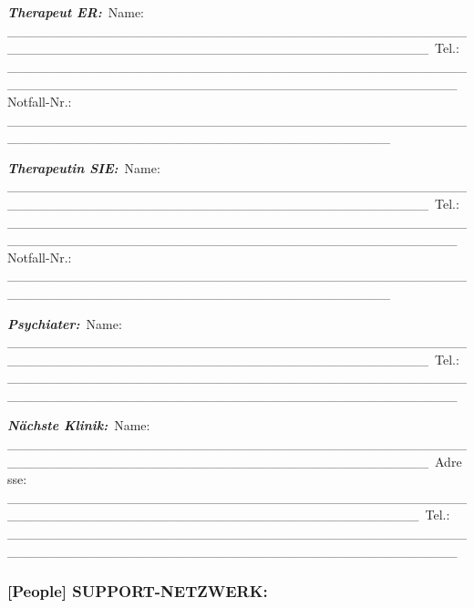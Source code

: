 \emph{\textbf{Therapeut ER:}}\
Name: \_\_\_\_\_\_\_\_\_\_\_\_\_\_\_\_\_\_\_\_\_\_\_\_\_\_\_\_\_\_\_\_\_\_\_\_\_\_\_\_\_\_\_\_\_\_\_\_\_\_\_\_\_\_\_\_\_\_\_\_\_\_\_\_\_\_\_\_\_\_\_\_\_\_\_\_\_\_\_\_\_\_\_\_\_\_\_\_\_\_\_\_\
Tel.: \_\_\_\_\_\_\_\_\_\_\_\_\_\_\_\_\_\_\_\_\_\_\_\_\_\_\_\_\_\_\_\_\_\_\_\_\_\_\_\_\_\_\_\_\_\_\_\_\_\_\_\_\_\_\_\_\_\_\_\_\_\_\_\_\_\_\_\_\_\_\_\_\_\_\_\_\_\_\_\_\_\_\_\_\_\_\_\_\_\_\_\_\_\_\_\
Notfall-Nr.: \_\_\_\_\_\_\_\_\_\_\_\_\_\_\_\_\_\_\_\_\_\_\_\_\_\_\_\_\_\_\_\_\_\_\_\_\_\_\_\_\_\_\_\_\_\_\_\_\_\_\_\_\_\_\_\_\_\_\_\_\_\_\_\_\_\_\_\_\_\_\_\_\_\_\_\_\_\_\_\_\_\_\_\_\_\_\_\_

\emph{\textbf{Therapeutin SIE:}}\
Name: \_\_\_\_\_\_\_\_\_\_\_\_\_\_\_\_\_\_\_\_\_\_\_\_\_\_\_\_\_\_\_\_\_\_\_\_\_\_\_\_\_\_\_\_\_\_\_\_\_\_\_\_\_\_\_\_\_\_\_\_\_\_\_\_\_\_\_\_\_\_\_\_\_\_\_\_\_\_\_\_\_\_\_\_\_\_\_\_\_\_\_\_\
Tel.: \_\_\_\_\_\_\_\_\_\_\_\_\_\_\_\_\_\_\_\_\_\_\_\_\_\_\_\_\_\_\_\_\_\_\_\_\_\_\_\_\_\_\_\_\_\_\_\_\_\_\_\_\_\_\_\_\_\_\_\_\_\_\_\_\_\_\_\_\_\_\_\_\_\_\_\_\_\_\_\_\_\_\_\_\_\_\_\_\_\_\_\_\_\_\_\
Notfall-Nr.: \_\_\_\_\_\_\_\_\_\_\_\_\_\_\_\_\_\_\_\_\_\_\_\_\_\_\_\_\_\_\_\_\_\_\_\_\_\_\_\_\_\_\_\_\_\_\_\_\_\_\_\_\_\_\_\_\_\_\_\_\_\_\_\_\_\_\_\_\_\_\_\_\_\_\_\_\_\_\_\_\_\_\_\_\_\_\_\_

\emph{\textbf{Psychiater:}}\
Name: \_\_\_\_\_\_\_\_\_\_\_\_\_\_\_\_\_\_\_\_\_\_\_\_\_\_\_\_\_\_\_\_\_\_\_\_\_\_\_\_\_\_\_\_\_\_\_\_\_\_\_\_\_\_\_\_\_\_\_\_\_\_\_\_\_\_\_\_\_\_\_\_\_\_\_\_\_\_\_\_\_\_\_\_\_\_\_\_\_\_\_\_\
Tel.: \_\_\_\_\_\_\_\_\_\_\_\_\_\_\_\_\_\_\_\_\_\_\_\_\_\_\_\_\_\_\_\_\_\_\_\_\_\_\_\_\_\_\_\_\_\_\_\_\_\_\_\_\_\_\_\_\_\_\_\_\_\_\_\_\_\_\_\_\_\_\_\_\_\_\_\_\_\_\_\_\_\_\_\_\_\_\_\_\_\_\_\_\_\_\_

\emph{\textbf{Nächste Klinik:}}\
Name: \_\_\_\_\_\_\_\_\_\_\_\_\_\_\_\_\_\_\_\_\_\_\_\_\_\_\_\_\_\_\_\_\_\_\_\_\_\_\_\_\_\_\_\_\_\_\_\_\_\_\_\_\_\_\_\_\_\_\_\_\_\_\_\_\_\_\_\_\_\_\_\_\_\_\_\_\_\_\_\_\_\_\_\_\_\_\_\_\_\_\_\_\
Adresse: \_\_\_\_\_\_\_\_\_\_\_\_\_\_\_\_\_\_\_\_\_\_\_\_\_\_\_\_\_\_\_\_\_\_\_\_\_\_\_\_\_\_\_\_\_\_\_\_\_\_\_\_\_\_\_\_\_\_\_\_\_\_\_\_\_\_\_\_\_\_\_\_\_\_\_\_\_\_\_\_\_\_\_\_\_\_\_\_\_\_\_\
Tel.: \_\_\_\_\_\_\_\_\_\_\_\_\_\_\_\_\_\_\_\_\_\_\_\_\_\_\_\_\_\_\_\_\_\_\_\_\_\_\_\_\_\_\_\_\_\_\_\_\_\_\_\_\_\_\_\_\_\_\_\_\_\_\_\_\_\_\_\_\_\_\_\_\_\_\_\_\_\_\_\_\_\_\_\_\_\_\_\_\_\_\_\_\_\_\_

\hypertarget{support-netzwerk-1}{%
\subsubsection{\texorpdfstring{\textbf{[People] SUPPORT-NETZWERK:}}{[People] SUPPORT-NETZWERK:}}\label{support-netzwerk-1}}

